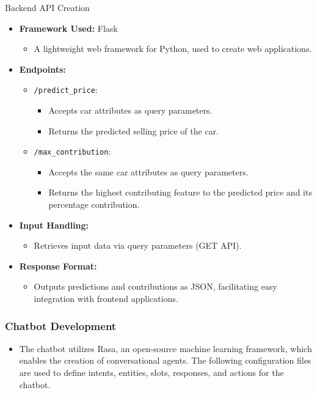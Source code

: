 \documentclass{beamer}
\begin{document}
\begin{frame}{Backend API Creation}
    \begin{itemize}
        \item \textbf{Framework Used:} Flask
        \begin{itemize}
            \item A lightweight web framework for Python, used to create web applications.
        \end{itemize}
        
        \item \textbf{Endpoints:}
        \begin{itemize}
            \item \texttt{/predict\_price}: 
            \begin{itemize}
                \item Accepts car attributes as query parameters.
                \item Returns the predicted selling price of the car.
            \end{itemize}
            \item \texttt{/max\_contribution}: 
            \begin{itemize}
                \item Accepts the same car attributes as query parameters.
                \item Returns the highest contributing feature to the predicted price and its percentage contribution.
            \end{itemize}
        \end{itemize}
        
        \item \textbf{Input Handling:}
        \begin{itemize}
            \item Retrieves input data via query parameters (GET API).
        \end{itemize}
        
        \item \textbf{Response Format:}
        \begin{itemize}
            \item Outputs predictions and contributions as JSON, facilitating easy integration with frontend applications.
        \end{itemize}
    \end{itemize}
\end{frame}

\begin{frame}
\frametitle{Chatbot Development}
\begin{itemize}
 	\item The chatbot utilizes Rasa, an open-source machine learning framework, which enables the creation of conversational agents. The following configuration files are used to define intents, entities, slots, responses, and actions for the chatbot.
\end{itemize}
\end{frame}
\end{document}
